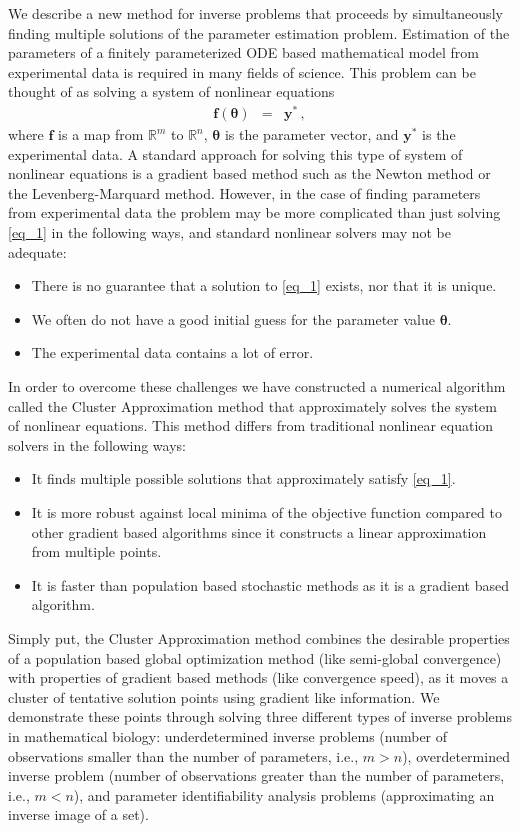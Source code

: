 \documentclass{report}
\begin{document}
We describe a new method for inverse problems that proceeds by
simultaneously finding multiple solutions of the parameter estimation
problem. Estimation of the parameters of a finitely parameterized ODE
based mathematical model from experimental data is required in many
fields of science. This problem can be thought of as solving a system of
nonlinear equations
\begin{eqnarray}
\boldsymbol{f}(\boldsymbol{\theta})&=&\boldsymbol{y}^*\,, \label{eq_1}
\end{eqnarray}
where $\boldsymbol{f}$ is a map from $\mathbb{R}^m$ to $\mathbb{R}^n$,
$\boldsymbol{\theta}$ is the parameter vector, and $\boldsymbol{y}^*$ is
the experimental data. A standard approach for solving this type of
system of nonlinear equations is a gradient based method such as the
Newton method or the Levenberg-Marquard method. However, in the case of
finding parameters from experimental data the problem may be more
complicated than just solving \eqref{eq_1} in the following ways, and
standard nonlinear solvers may not be adequate:
\begin{itemize}
\item There is no guarantee that a solution to \eqref{eq_1} exists, nor
that it is unique.
\item We often do not have a good initial guess for the parameter value
$\boldsymbol{\theta}$.
\item The experimental data contains a lot of error.
\end{itemize}
In order to overcome these challenges we have constructed a numerical
algorithm called the Cluster Approximation method that approximately
solves the system of nonlinear equations. This method differs from
traditional nonlinear equation solvers in the following ways:
\begin{itemize}
\item It finds multiple possible solutions that approximately satisfy \eqref{eq_1}.
\item It is more robust against local minima of the objective function
compared to other gradient based algorithms since it constructs a linear
approximation from multiple points.
\item It is faster than population based stochastic methods as it is a
gradient based algorithm.
\end{itemize}
Simply put, the Cluster Approximation method combines the desirable
properties of a population based global optimization method (like
semi-global convergence) with properties of gradient based methods (like
convergence speed), as it moves a cluster of tentative solution points
using gradient like information.
We demonstrate these points through solving three different types of
inverse problems in mathematical biology: underdetermined inverse
problems (number of observations smaller than the number of parameters,
i.e., $m>n$), overdetermined inverse problem (number of observations
greater than the number of parameters, i.e., $m<n$), and parameter
identifiability analysis problems (approximating an inverse image of a
set).
\end{document}
